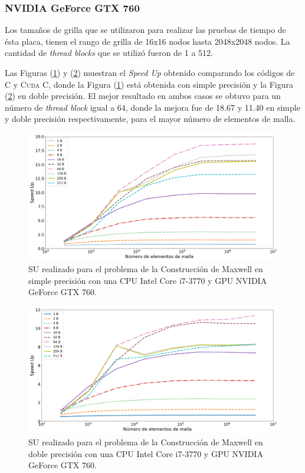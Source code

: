 \subsubsection{NVIDIA GeForce GTX 760}

Los tamaños de grilla que se utilizaron para realizar las pruebas de tiempo de ésta placa, tienen el rango de grilla de 16x16 nodos hasta 2048x2048 nodos. La cantidad de \textit{thread blocks} que se utilizó fueron de 1 a 512.

Las Figuras (\ref{fig:s_760_MxC_simple_1.0}) y (\ref{fig:s_760_MxC_double_1.0}) muestran el \textit{Speed Up} obtenido comparando los códigos de \textsc{C} y \textsc{Cuda C}, donde la Figura (\ref{fig:s_760_MxC_simple_1.0}) está obtenida con simple precisión y la Figura (\ref{fig:s_760_MxC_double_1.0}) en doble precisión. El mejor resultado en ambos casos se obtuvo para un número de \textit{thread block} igual a 64, donde la mejora fue de 18.67 y 11.40 en simple y doble precisión respectivamente, para el mayor número de elementos de malla.


\begin{figure}[htbp]
	\centering
	\includegraphics[width=\textwidth]{figs/cap4/s_760_MxC_simple_10}
	\caption{SU realizado para el problema de la Construcción de Maxwell en simple precisión con una CPU Intel Core i7-3770 y GPU NVIDIA GeForce GTX 760.} 
	\label{fig:s_760_MxC_simple_1.0}	
\end{figure}

\begin{figure}[htbp]
	\centering
	\includegraphics[width=\textwidth]{figs/cap4/s_760_MxC_double_10}
	\caption{SU realizado para el problema de la Construcción de Maxwell en doble precisión con una CPU Intel Core i7-3770 y GPU NVIDIA GeForce GTX 760.} 
	\label{fig:s_760_MxC_double_1.0}	
\end{figure}


